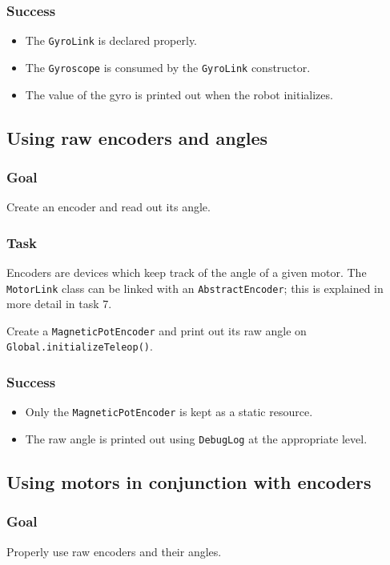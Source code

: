 \documentclass[a4paper]{article}
\begin{document}
\subsubsection{Success}\begin{itemize}\item{The \lstinline{GyroLink} is declared properly.}\item{The \lstinline{Gyroscope} is consumed by the \lstinline{GyroLink} constructor.}\item{The value of the gyro is printed out when the robot initializes.}\end{itemize}

\pagebreak\subsection{Using raw encoders and angles}
\subsubsection{Goal} Create an encoder and read out its angle.
\setcounter{subsubsection}{2}\subsubsection{Task} Encoders are devices which keep track of the angle of a given motor. The \lstinline{MotorLink} class can be linked with an \lstinline{AbstractEncoder}; this is explained in more detail in task 7.

Create a \lstinline{MagneticPotEncoder} and print out its raw angle on \lstinline{Global.initializeTeleop()}.
\subsubsection{Success} \begin{itemize}\item{Only the \lstinline{MagneticPotEncoder} is kept as a static resource.}\item{The raw angle is printed out using \lstinline{DebugLog} at the appropriate level.}\end{itemize}

\pagebreak\subsection{Using motors in conjunction with encoders}
\subsubsection{Goal} Properly use raw encoders and their angles.
\end{document}
